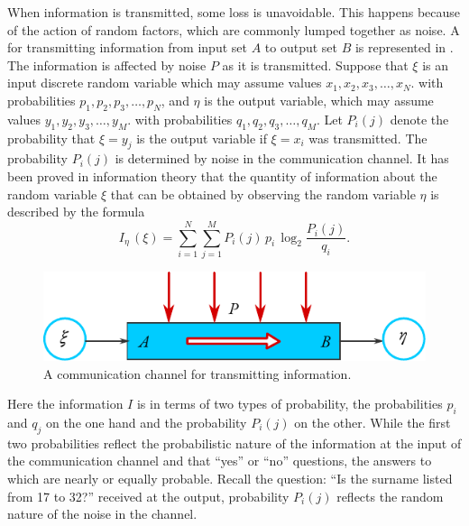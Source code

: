  When information is transmitted, some loss is unavoidable. This happens because of the action of random factors, which are commonly lumped together as noise. A  for transmitting information from input set $A$ to output set $B$ is represented in . The information is affected by noise $P$ as it is transmitted. Suppose that $\xi$ is an input discrete random variable which may assume values $x_{1}, x_{2}, x_{3},\ldots{} , x_{N}$. with probabilities  $p_{1}, p_{2}, p_{3},\ldots{} , p_{N}$, and $\eta$ is the output variable, which may assume values $y_{1}, y_{2}, y_{3},\ldots , y_{M}$. with probabilities  $q_{1}, q_{2}, q_{3},\ldots{} , q_{M}$. Let $P_{i}(j)$ denote the probability that $\xi = y_{j}$ is the output variable if $\xi = x_{i}$ was transmitted. The probability $P_{i}(j)$ is determined by noise in the communication channel. It has been proved in information theory that the quantity of information about the random variable $\xi$ that can be obtained by observing the random variable $\eta$ is described by the formula
\begin{equation}%
I_{\eta} \, (\xi) = \sum_{i=1}^{N}\sum_{j=1}^{M} P_{i}(j) \, p_{i}  \, \log_{2} \frac{P_{i}(j)}{q_{i}}.
\label{eq-3.4}
\end{equation}
\begin{figure}[!ht]
 \centering
 \includegraphics[width=0.8\tfwidth]{figures/comm-channel.pdf}
\caption{A communication channel for transmitting information.\label{comm-channel}}
\end{figure}
Here the information $I$ is in terms of two types of probability, the
probabilities $p_{i}$ and $q_{j}$ on the one hand and the probability $P_{i}(j)$ on the other. While the first two probabilities reflect the probabilistic nature of
the information at the input of the communication channel and that
``yes'' or ``no'' questions, the answers to which are nearly or equally
probable. Recall the question: ``Is the surname listed from 17 to 32?''
received at the output, probability $P_{i}(j)$ reflects the random nature of
the noise in the channel.

